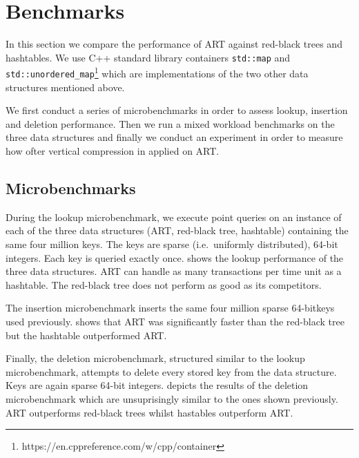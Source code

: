 \documentclass[abstracton,12pt]{scrartcl}
\theoremstyle{definition}
\begin{document}
\newpage

\section{Benchmarks}
\label{sec:benchmarks}

In this section we compare the performance of ART against red-black trees
and hashtables. We use C++ standard library containers 
\texttt{std::map} and \texttt{std::unordered\_map}\footnote{https://en.cppreference.com/w/cpp/container}
which are implementations of the two other data structures mentioned above.

We first conduct a series of microbenchmarks in order to assess lookup,
insertion and deletion performance. Then we run a mixed workload benchmarks
on the three data structures and finally we conduct an experiment in order
to measure how ofter vertical compression in applied on ART.

\subsection{Microbenchmarks}
\label{sec:microbenchmarks}

During the lookup microbenchmark, we execute point queries on an instance
of each of the three data structures (ART, red-black tree, hashtable)
containing the same four million keys. The keys are sparse (i.e.\ uniformly
distributed), 64-bit integers. Each key is queried exactly once.
shows the lookup performance of the three data structures. ART can handle
as many transactions per time unit as a hashtable. The red-black tree does
not perform as good as its competitors.

The insertion microbenchmark inserts the same four million sparse 64-bitkeys
used previously.  shows that ART was 
significantly faster than the red-black tree but the hashtable outperformed ART.

Finally, the deletion microbenchmark, structured similar to the lookup
microbenchmark, attempts to delete every stored key from the data structure.
Keys are again sparse 64-bit integers.  
depicts the results of the
deletion microbenchmark which are unsuprisingly similar to the ones shown
previously. ART outperforms red-black trees whilst hastables outperform
ART.
\end{document}
